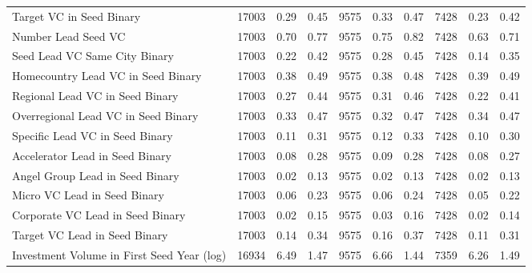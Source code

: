 {\begin{table}[!h]
{\begin{tabular}[t]{lrrrrrrrrr}
Target VC in Seed Binary & 17003 & 0.29 & 0.45 & 9575 & 0.33 & 0.47 & 7428 & 0.23 & 0.42\\
Number Lead Seed VC & 17003 & 0.70 & 0.77 & 9575 & 0.75 & 0.82 & 7428 & 0.63 & 0.71\\
Seed Lead VC Same City Binary & 17003 & 0.22 & 0.42 & 9575 & 0.28 & 0.45 & 7428 & 0.14 & 0.35\\
Homecountry Lead VC in Seed Binary & 17003 & 0.38 & 0.49 & 9575 & 0.38 & 0.48 & 7428 & 0.39 & 0.49\\
\addlinespace
Regional Lead VC in Seed Binary & 17003 & 0.27 & 0.44 & 9575 & 0.31 & 0.46 & 7428 & 0.22 & 0.41\\
Overregional Lead VC in Seed Binary & 17003 & 0.33 & 0.47 & 9575 & 0.32 & 0.47 & 7428 & 0.34 & 0.47\\
Specific Lead VC in Seed Binary & 17003 & 0.11 & 0.31 & 9575 & 0.12 & 0.33 & 7428 & 0.10 & 0.30\\
Accelerator Lead in Seed Binary & 17003 & 0.08 & 0.28 & 9575 & 0.09 & 0.28 & 7428 & 0.08 & 0.27\\
Angel Group Lead in Seed Binary & 17003 & 0.02 & 0.13 & 9575 & 0.02 & 0.13 & 7428 & 0.02 & 0.13\\
\addlinespace
Micro VC Lead in Seed Binary & 17003 & 0.06 & 0.23 & 9575 & 0.06 & 0.24 & 7428 & 0.05 & 0.22\\
Corporate VC Lead in Seed Binary & 17003 & 0.02 & 0.15 & 9575 & 0.03 & 0.16 & 7428 & 0.02 & 0.14\\
Target VC Lead in Seed Binary & 17003 & 0.14 & 0.34 & 9575 & 0.16 & 0.37 & 7428 & 0.11 & 0.31\\
Investment Volume in First Seed Year (log) & 16934 & 6.49 & 1.47 & 9575 & 6.66 & 1.44 & 7359 & 6.26 & 1.49\\
\bottomrule
\end{tabular}}
\end{table}
}
